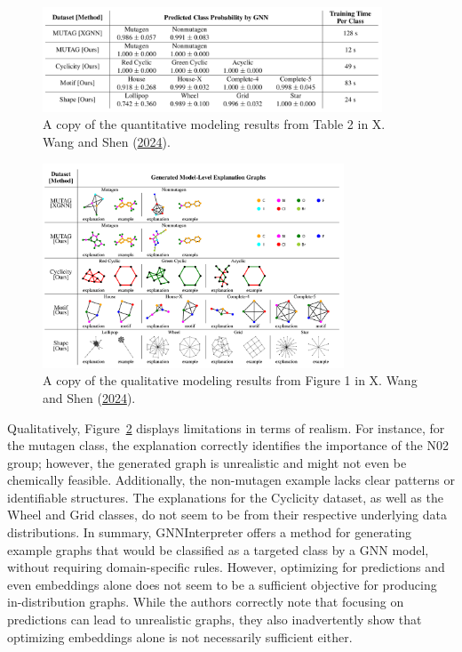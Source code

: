 \documentclass[
  11pt,
  letterpaper,
]{article}
\begin{document}
\begin{figure}

{\centering \includegraphics[width=0.9\textwidth,height=\textheight]{figures/GNNInt_prediction_results.png}

}

\caption{\label{fig-GNNInt-pred-results}A copy of the quantitative
modeling results from Table 2 in X. Wang and Shen
(\protect\hyperlink{ref-Wang_Shen_2024}{2024}).}

\end{figure}

\begin{figure}

{\centering \includegraphics[width=0.8\textwidth,height=\textheight]{figures/GNNInt_drawn_results.png}

}

\caption{\label{fig-GNNInt-Drawn}A copy of the qualitative modeling
results from Figure 1 in X. Wang and Shen
(\protect\hyperlink{ref-Wang_Shen_2024}{2024}).}

\end{figure}

Qualitatively, Figure~\ref{fig-GNNInt-Drawn} displays limitations in
terms of realism. For instance, for the mutagen class, the explanation
correctly identifies the importance of the N02 group; however, the
generated graph is unrealistic and might not even be chemically
feasible. Additionally, the non-mutagen example lacks clear patterns or
identifiable structures. The explanations for the Cyclicity dataset, as
well as the Wheel and Grid classes, do not seem to be from their
respective underlying data distributions. In summary, GNNInterpreter
offers a method for generating example graphs that would be classified
as a targeted class by a GNN model, without requiring domain-specific
rules. However, optimizing for predictions and even embeddings alone
does not seem to be a sufficient objective for producing in-distribution
graphs. While the authors correctly note that focusing on predictions
can lead to unrealistic graphs, they also inadvertently show that
optimizing embeddings alone is not necessarily sufficient either.
\end{document}
